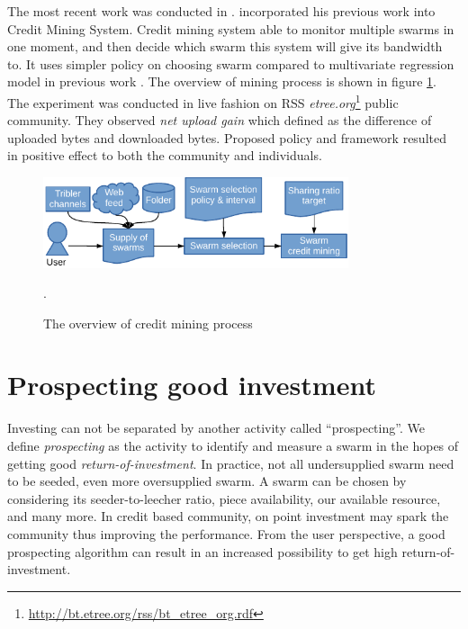 The most recent work was conducted in \citeyear{2015:creditmining:capota} \cite{2015:creditmining:capota}. \citeauthor{2015:creditmining:capota} incorporated his previous work into Credit Mining System. Credit mining system able to monitor multiple swarms in one moment, and then decide which swarm this system will give its bandwidth to. It uses simpler policy on choosing swarm compared to multivariate regression model in previous work \cite{2013:investmentcm:capota}. The overview of mining process is shown in figure \ref{fig:cm15}. The experiment was conducted in live fashion on RSS \textit{etree.org}\footnote{\url{http://bt.etree.org/rss/bt\_etree\_org.rdf}} public community. They observed \textit{net upload gain} which defined as the difference of uploaded bytes and downloaded bytes. Proposed policy and framework resulted in positive effect to both the community and individuals.

\begin{figure}[ht]
	\centering
	\includegraphics[width=0.8\textwidth]{pics/creditmining2015.pdf}
	\caption{The overview of credit mining process \cite{2015:creditmining:capota}}.
	\label{fig:cm15}
\end{figure}


\section{Prospecting good investment}

Investing can not be separated by another activity called ``prospecting''. We define \textit{prospecting} as the activity to identify and measure a swarm in the hopes of getting good \textit{return-of-investment}. In practice, not all undersupplied swarm need to be seeded, even more oversupplied swarm. A swarm can be chosen by considering its seeder-to-leecher ratio, piece availability, our available resource, and many more. In credit based community, on point investment may spark the community thus improving the performance. From the user perspective, a good prospecting algorithm can result in an increased possibility to get high return-of-investment.

